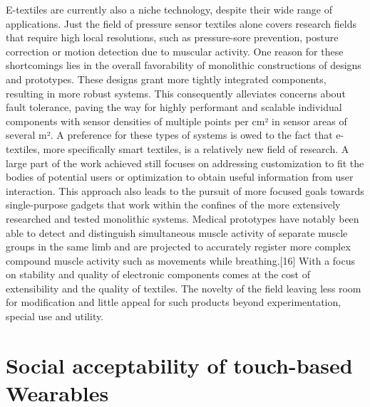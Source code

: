 \documentclass{sigchi}
\begin{document}
E-textiles are currently also a niche technology, despite their wide range of applications.
Just the field of pressure sensor textiles alone covers research fields that require high local resolutions, such as pressure-sore prevention, posture correction \cite{smart-rehabilitation} or motion detection due to muscular activity. \cite{vogel5}
One reason for these shortcomings lies in the overall favorability of monolithic constructions of designs and prototypes. These designs grant more tightly integrated components, resulting in more robust systems. This consequently alleviates concerns about fault tolerance, paving the way for highly performant and scalable individual components with sensor densities of multiple points per cm² in sensor areas of several m².\cite{vogel4}  A preference for these  types of systems is owed to the fact that e-textiles, more specifically smart textiles, is a relatively new field of research. \cite{simpleskin} A large part of the work achieved still focuses on addressing customization to fit the bodies of potential users or optimization to obtain useful information from user interaction. \cite{smart-rehabilitation} This approach also leads to the pursuit of more focused goals towards single-purpose gadgets that work within the confines of the more extensively researched and tested monolithic systems. Medical prototypes have notably been able to detect and distinguish simultaneous muscle activity of separate muscle groups in the same limb and are projected to accurately register more complex compound muscle activity such as movements while breathing.[16] With a focus on stability and quality of electronic components comes at the cost of extensibility and the quality of textiles. The novelty of the field  leaving less room for modification and little appeal for such products beyond experimentation, special use and utility. \cite{simpleskin, vogel4} %

\section{Social acceptability of touch-based Wearables}
\end{document}
